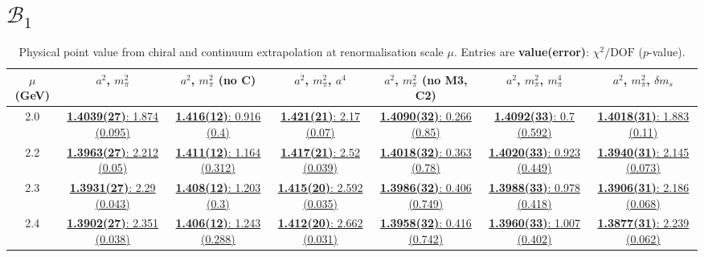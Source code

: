 \documentclass[12pt]{extarticle}
\begin{document}
\clearpage
\section{$\mathcal{B}_1$}
\begin{table}[h!]
\begin{center}
\begin{tabular}{|c|c|c|c|c|c|c|}
\hline
$\mu$ (GeV) & $a^2$, $m_\pi^2$& $a^2$, $m_\pi^2$ (no C)& $a^2$, $m_\pi^2$, $a^4$& $a^2$, $m_\pi^2$ (no M3, C2)& $a^2$, $m_\pi^2$, $m_\pi^4$& $a^2$, $m_\pi^2$, $\delta m_s$\\
\hline
2.0& \hyperlink{VVpAA/SUSY/bag_a2m2_20.pdf.1}{\textbf{1.4039(27)}: 1.874 (0.095)} & \hyperlink{VVpAA/SUSY/bag_a2m2noC_20.pdf.1}{\textbf{1.416(12)}: 0.916 (0.4)} & \hyperlink{VVpAA/SUSY/bag_a2a4m2_20.pdf.1}{\textbf{1.421(21)}: 2.17 (0.07)} & \hyperlink{VVpAA/SUSY/bag_a2m2mcut_20.pdf.1}{\textbf{1.4090(32)}: 0.266 (0.85)} & \hyperlink{VVpAA/SUSY/bag_a2m2m4_20.pdf.1}{\textbf{1.4092(33)}: 0.7 (0.592)} & \hyperlink{VVpAA/SUSY/bag_a2m2delm_20.pdf.1}{\textbf{1.4018(31)}: 1.883 (0.11)}\\
2.2& \hyperlink{VVpAA/SUSY/bag_a2m2_22.pdf.1}{\textbf{1.3963(27)}: 2.212 (0.05)} & \hyperlink{VVpAA/SUSY/bag_a2m2noC_22.pdf.1}{\textbf{1.411(12)}: 1.164 (0.312)} & \hyperlink{VVpAA/SUSY/bag_a2a4m2_22.pdf.1}{\textbf{1.417(21)}: 2.52 (0.039)} & \hyperlink{VVpAA/SUSY/bag_a2m2mcut_22.pdf.1}{\textbf{1.4018(32)}: 0.363 (0.78)} & \hyperlink{VVpAA/SUSY/bag_a2m2m4_22.pdf.1}{\textbf{1.4020(33)}: 0.923 (0.449)} & \hyperlink{VVpAA/SUSY/bag_a2m2delm_22.pdf.1}{\textbf{1.3940(31)}: 2.145 (0.073)}\\
2.3& \hyperlink{VVpAA/SUSY/bag_a2m2_23.pdf.1}{\textbf{1.3931(27)}: 2.29 (0.043)} & \hyperlink{VVpAA/SUSY/bag_a2m2noC_23.pdf.1}{\textbf{1.408(12)}: 1.203 (0.3)} & \hyperlink{VVpAA/SUSY/bag_a2a4m2_23.pdf.1}{\textbf{1.415(20)}: 2.592 (0.035)} & \hyperlink{VVpAA/SUSY/bag_a2m2mcut_23.pdf.1}{\textbf{1.3986(32)}: 0.406 (0.749)} & \hyperlink{VVpAA/SUSY/bag_a2m2m4_23.pdf.1}{\textbf{1.3988(33)}: 0.978 (0.418)} & \hyperlink{VVpAA/SUSY/bag_a2m2delm_23.pdf.1}{\textbf{1.3906(31)}: 2.186 (0.068)}\\
2.4& \hyperlink{VVpAA/SUSY/bag_a2m2_24.pdf.1}{\textbf{1.3902(27)}: 2.351 (0.038)} & \hyperlink{VVpAA/SUSY/bag_a2m2noC_24.pdf.1}{\textbf{1.406(12)}: 1.243 (0.288)} & \hyperlink{VVpAA/SUSY/bag_a2a4m2_24.pdf.1}{\textbf{1.412(20)}: 2.662 (0.031)} & \hyperlink{VVpAA/SUSY/bag_a2m2mcut_24.pdf.1}{\textbf{1.3958(32)}: 0.416 (0.742)} & \hyperlink{VVpAA/SUSY/bag_a2m2m4_24.pdf.1}{\textbf{1.3960(33)}: 1.007 (0.402)} & \hyperlink{VVpAA/SUSY/bag_a2m2delm_24.pdf.1}{\textbf{1.3877(31)}: 2.239 (0.062)}\\
\hline
\end{tabular}
\caption{Physical point value from chiral and continuum extrapolation at renormalisation scale $\mu$. Entries are \textbf{value(error)}: $\chi^2/\text{DOF}$ ($p$-value).}
\end{center}
\end{table}
\end{document}
